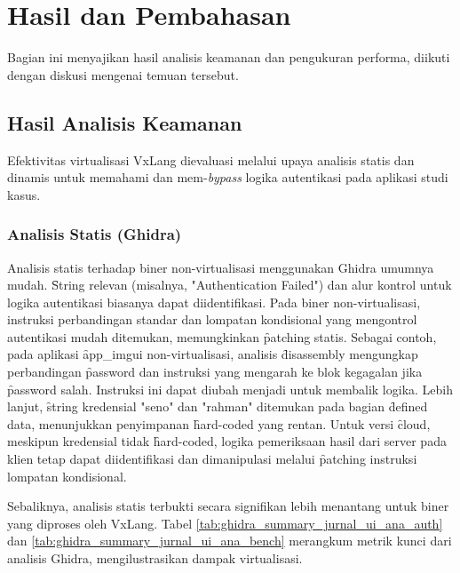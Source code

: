 \section{Hasil dan Pembahasan}
\label{sec:hasil_jurnal_ui_ana}

Bagian ini menyajikan hasil analisis keamanan dan pengukuran performa, diikuti dengan diskusi mengenai temuan tersebut.

\subsection{Hasil Analisis Keamanan}
Efektivitas virtualisasi VxLang dievaluasi melalui upaya analisis statis dan dinamis untuk memahami dan mem-\textit{bypass} logika autentikasi pada aplikasi studi kasus.

\subsubsection{Analisis Statis (Ghidra)}
Analisis statis terhadap biner non-virtualisasi menggunakan Ghidra umumnya mudah. \f{String} relevan (misalnya, "Authentication Failed") dan alur kontrol untuk logika autentikasi biasanya dapat diidentifikasi. Pada biner non-virtualisasi, instruksi perbandingan standar dan lompatan kondisional yang mengontrol autentikasi mudah ditemukan, memungkinkan \f{patching} statis. Sebagai contoh, pada aplikasi \f{app\_imgui} non-virtualisasi, analisis \f{disassembly} mengungkap perbandingan \f{password} dan instruksi  yang mengarah ke blok kegagalan jika \f{password} salah. Instruksi ini dapat diubah menjadi  untuk membalik logika. Lebih lanjut, \f{string} kredensial "seno" dan "rahman" ditemukan pada bagian \f{defined data}, menunjukkan penyimpanan \f{hard-coded} yang rentan. Untuk versi \f{cloud}, meskipun kredensial tidak \f{hard-coded}, logika pemeriksaan hasil dari server pada klien tetap dapat diidentifikasi dan dimanipulasi melalui \f{patching} instruksi lompatan kondisional.

Sebaliknya, analisis statis terbukti secara signifikan lebih menantang untuk biner yang diproses oleh VxLang. Tabel \ref{tab:ghidra_summary_jurnal_ui_ana_auth} dan \ref{tab:ghidra_summary_jurnal_ui_ana_bench} merangkum metrik kunci dari analisis Ghidra, mengilustrasikan dampak virtualisasi.

